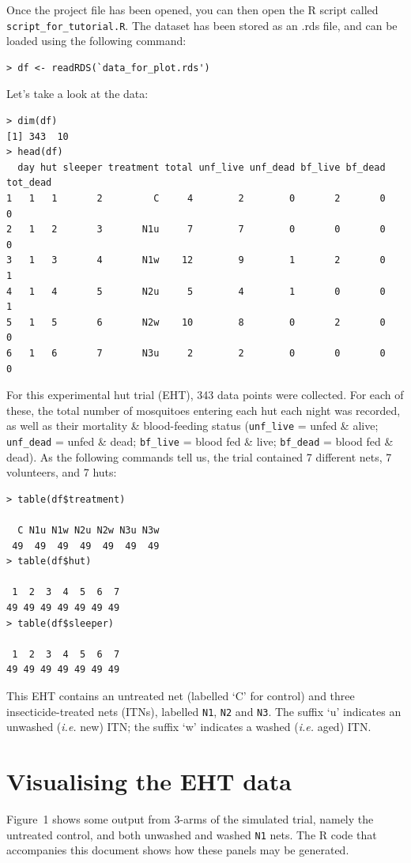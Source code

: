 \documentclass[11pt]{article}
\begin{document}
Once the project file has been opened, you can then open the R script called \verb+script_for_tutorial.R+. The dataset has been stored as an .rds file, and can be loaded using the following command:
\begin{verbatim}
> df <- readRDS(`data_for_plot.rds')
\end{verbatim}
Let's take a look at the data:
\begin{verbatim}
> dim(df)
[1] 343  10
> head(df)
  day hut sleeper treatment total unf_live unf_dead bf_live bf_dead tot_dead
1   1   1       2         C     4        2        0       2       0        0
2   1   2       3       N1u     7        7        0       0       0        0
3   1   3       4       N1w    12        9        1       2       0        1
4   1   4       5       N2u     5        4        1       0       0        1
5   1   5       6       N2w    10        8        0       2       0        0
6   1   6       7       N3u     2        2        0       0       0        0
\end{verbatim}
For this experimental hut trial (EHT), 343 data points were collected. For each of these, the total number of mosquitoes entering each hut each night was recorded, as well as their mortality \& blood-feeding status (\verb+unf_live+ = unfed \& alive; \verb+unf_dead+ = unfed \& dead; \verb+bf_live+ = blood fed \& live; \verb+bf_dead+ = blood fed \& dead). As the following commands tell us, the trial contained 7 different nets, 7 volunteers, and 7 huts:
\begin{verbatim}
> table(df$treatment)

  C N1u N1w N2u N2w N3u N3w 
 49  49  49  49  49  49  49 
> table(df$hut)

 1  2  3  4  5  6  7 
49 49 49 49 49 49 49 
> table(df$sleeper)

 1  2  3  4  5  6  7 
49 49 49 49 49 49 49 
\end{verbatim}
This EHT contains an untreated net (labelled `C' for control) and three insecticide-treated nets (ITNs), labelled \verb+N1+, \verb+N2+ and \verb+N3+. The suffix `u' indicates an unwashed (\textit{i.e.} new) ITN; the suffix `w' indicates a washed (\textit{i.e.} aged) ITN.

\section{Visualising the EHT data}

Figure~1 shows some output from 3-arms of the simulated trial, namely the untreated control, and both unwashed and washed \verb+N1+ nets. The R code that accompanies this document shows how these panels may be generated.
\end{document}
